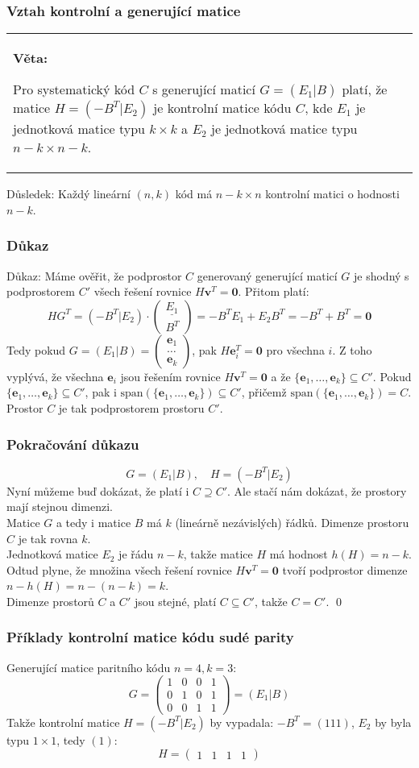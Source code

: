 \documentclass{beamer}
\newenvironment{veta}
{
    \begin{center}
    \begin{tabular}{p{9cm}}
    \textbf{Věta:}
}
{
    \end{tabular}
    \end{center}
}
\newcommand{\vv}{\textbf{v}}
\newcommand{\e}{\textbf{e}}
\renewcommand{\span}{\mbox{span}}
\newcommand{\zero}{\textbf{0}}
\newcommand{\emptyline}{\\$\,$\\}
\begin{document}
\begin{frame}[t,fragile]\frametitle{Vztah kontrolní a generující matice} 
    \begin{veta}
        Pro systematický kód $C$ s generující maticí $G=(E_1|B)$ platí, že matice $H=(-B^T|E_2)$ je kontrolní matice kódu $C$, kde $E_1$ je jednotková matice typu $k\times k$ a $E_2$ je jednotková matice typu $n-k\times n-k$.
    \end{veta}

    Důsledek: Každý lineární $(n,k)$ kód má $n-k\times n$ kontrolní matici o hodnosti $n-k$.
\end{frame}


\begin{frame}[t,fragile]\frametitle{Důkaz} 
    Důkaz: Máme ověřit, že podprostor $C$ generovaný generující maticí $G$ je shodný s podprostorem $C'$ všech řešení rovnice $H\vv^T=\zero$. Přitom platí:
    $$
HG^T=\left(-B^T|E_2\right)\cdot\left(
\begin{matrix}
\underline{E_1}\\
B^T
\end{matrix}
\right)
=-B^TE_1+E_2B^T=-B^T+B^T=\zero
    $$
    Tedy pokud $G=(E_1|B)=\begin{pmatrix}
    \e_1\\\dots\\\e_k
    \end{pmatrix}$, pak $H\e_i^T=\zero$ pro všechna $i$. Z toho vyplývá, že všechna $\e_i$ jsou řešením rovnice $H\vv^T=\zero$ a že $\{\e_1,\dots,\e_k\}\subseteq C'$. Pokud $\{\e_1,\dots,\e_k\}\subseteq C'$, pak i $\span(\{\e_1,\dots,\e_k\})\subseteq C'$, přičemž $\span(\{\e_1,\dots,\e_k\})=C$. Prostor $C$ je tak podprostorem prostoru $C'$.
\end{frame}

\begin{frame}[t,fragile]\frametitle{Pokračování důkazu} 
$$
G=(E_1|B),\quad H=(-B^T|E_2)
$$
Nyní můžeme buď dokázat, že platí i $C\supseteq C'$. Ale stačí nám dokázat, že prostory mají stejnou dimenzi. 
\emptyline
Matice $G$ a tedy i matice $B$ má $k$ (lineárně nezávislých) řádků. Dimenze prostoru $C$ je tak rovna $k$.
\emptyline 
Jednotková matice $E_2$ je řádu $n-k$, takže matice $H$ má hodnost $h(H)=n-k$. Odtud plyne, že množina všech řešení rovnice $H\vv^T=\zero$ tvoří podprostor dimenze $n-h(H)=n-(n-k)=k$.
\emptyline
Dimenze prostorů $C$ a $C'$ jsou stejné, platí $C\subseteq C'$, takže $C=C'$. \qed
\end{frame}


\begin{frame}[t,fragile]\frametitle{Příklady kontrolní matice kódu sudé parity} 
Generující matice paritního kódu $n=4, k=3$:
$$
G=
\begin{pmatrix}
1&0&0&1\\
0&1&0&1\\
0&0&1&1
\end{pmatrix}
=(E_1|B)
$$
Takže kontrolní matice $H=(-B^T|E_2)$ by vypadala: $-B^T=(111)$, $E_2$ by byla typu $1\times1$, tedy $(1)$:
$$
H=
\begin{pmatrix}
1&1&1&1
\end{pmatrix}
$$
\end{frame}
\end{document}
